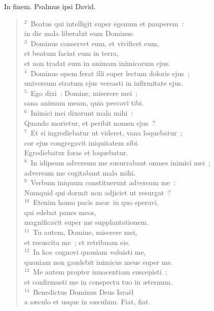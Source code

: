 \lettrine[lines=3,image=true,loversize=0.05,lraise=-0.03]{I}{}n finem. Psalmus ipsi David.
\begin{flushleft}\begin{verse}\vspace{6pt}${}^{2}$~Beatus qui intelligit super egenum et pauperem~:\\ in die mala liberabit eum Dominus.\\
${}^{3}$~Dominus conservet eum, et vivificet eum,\\ et beatum faciat eum in terra,\\ et non tradat eum in animam inimicorum ejus.\\
${}^{4}$~Dominus opem ferat illi super lectum doloris ejus~;\\ universum stratum ejus versasti in infirmitate ejus.\\
${}^{5}$~Ego dixi~: Domine, miserere mei~;\\ sana animam meam, quia peccavi tibi.\\
${}^{6}$~Inimici mei dixerunt mala mihi~:\\ Quando morietur, et peribit nomen ejus~?\\
${}^{7}$~Et si ingrediebatur ut videret, vana loquebatur~;\\ cor ejus congregavit iniquitatem sibi.\\ Egrediebatur foras et loquebatur.\\
${}^{8}$~In idipsum adversum me susurrabant omnes inimici mei~;\\ adversum me cogitabant mala mihi.\\
${}^{9}$~Verbum iniquum constituerunt adversum me~:\\ Numquid qui dormit non adjiciet ut resurgat~?\\
${}^{10}$~Etenim homo pacis me\ae\ in quo speravi,\\ qui edebat panes meos,\\ magnificavit super me supplantationem.\\
${}^{11}$~Tu autem, Domine, miserere mei,\\ et resuscita me~; et retribuam eis.\\
${}^{12}$~In hoc cognovi quoniam voluisti me,\\ quoniam non gaudebit inimicus meus super me.\\
${}^{13}$~Me autem propter innocentiam suscepisti~;\\ et confirmasti me in conspectu tuo in \ae ternum.\\
${}^{14}$~Benedictus Dominus Deus Isra\"el\\ a s\ae culo et usque in s\ae culum. Fiat, fiat.\end{verse}\end{flushleft}



